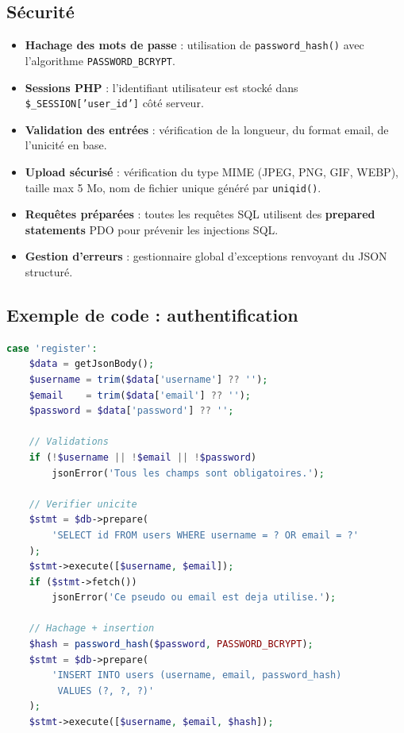 \documentclass[12pt,a4paper]{report}
\begin{document}
\subsection{Sécurité}

\begin{itemize}[noitemsep]
    \item \textbf{Hachage des mots de passe} : utilisation de \texttt{password\_hash()} avec l'algorithme \texttt{PASSWORD\_BCRYPT}.
    \item \textbf{Sessions PHP} : l'identifiant utilisateur est stocké dans \texttt{\$\_SESSION['user\_id']} côté serveur.
    \item \textbf{Validation des entrées} : vérification de la longueur, du format email, de l'unicité en base.
    \item \textbf{Upload sécurisé} : vérification du type MIME (JPEG, PNG, GIF, WEBP), taille max 5 Mo, nom de fichier unique généré par \texttt{uniqid()}.
    \item \textbf{Requêtes préparées} : toutes les requêtes SQL utilisent des \textbf{prepared statements} PDO pour prévenir les injections SQL.
    \item \textbf{Gestion d'erreurs} : gestionnaire global d'exceptions renvoyant du JSON structuré.
\end{itemize}

\subsection{Exemple de code : authentification}

\begin{lstlisting}[language=PHP, caption={Extrait de auth.php — Inscription}]
case 'register':
    $data = getJsonBody();
    $username = trim($data['username'] ?? '');
    $email    = trim($data['email'] ?? '');
    $password = $data['password'] ?? '';

    // Validations
    if (!$username || !$email || !$password)
        jsonError('Tous les champs sont obligatoires.');

    // Verifier unicite
    $stmt = $db->prepare(
        'SELECT id FROM users WHERE username = ? OR email = ?'
    );
    $stmt->execute([$username, $email]);
    if ($stmt->fetch())
        jsonError('Ce pseudo ou email est deja utilise.');

    // Hachage + insertion
    $hash = password_hash($password, PASSWORD_BCRYPT);
    $stmt = $db->prepare(
        'INSERT INTO users (username, email, password_hash)
         VALUES (?, ?, ?)'
    );
    $stmt->execute([$username, $email, $hash]);
\end{lstlisting}
\end{document}
